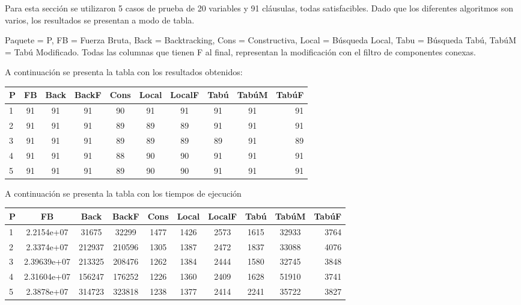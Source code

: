 \documentclass[a4paper,10pt]{article}
\begin{document}
\medskip

Para esta secci\'on se utilizaron 5 casos de prueba de 20 variables y 91 cl\'ausulas, todas satisfacibles. Dado que los diferentes algoritmos son varios, los resultados se presentan a modo de tabla.
\medskip

Paquete = P, FB = Fuerza Bruta, Back = Backtracking, Cons = Constructiva, Local = B\'usqueda Local, Tabu = B\'usqueda Tab\'u, Tab\'uM = Tab\'u Modificado. Todas las columnas que tienen F al final, representan la modificaci\'on con el filtro de componentes conexas.

A continuaci\'on se presenta la tabla con los resultados obtenidos:
\medskip

\begin{center}
\begin{tabular}{||l|c|c|c|c|c|c|c|c|r||}
\hline
\hline
P & FB & Back & BackF & Cons & Local & LocalF & Tab\'u & Tab\'uM & Tab\'uF\\
\hline
1 & 91 & 91 & 91 & 90 & 91 & 91 & 91 & 91 & 91\\
\hline
2 & 91 & 91 & 91 & 89 & 89 & 89 & 91 & 91 & 91\\
\hline
3 & 91 & 91 & 91 & 89 & 89 & 89 & 89 & 91 & 89\\
\hline
4 & 91 & 91 & 91 & 88 & 90 & 90 & 91 & 91 & 91\\
\hline
5 & 91 & 91 & 91 & 89 & 90 & 90 & 91 & 91 & 91\\
\hline
\hline
\end{tabular}
\end{center}
\medskip

A continuaci\'on se presenta la tabla con los tiempos de ejecuci\'on
\begin{center}
\begin{tabular}{||l|c|c|c|c|c|c|c|c|r||}
\hline
\hline
P & FB & Back & BackF & Cons & Local & LocalF & Tab\'u & Tab\'uM & Tab\'uF\\
\hline
1 & 2.2154e+07 & 31675 & 32299 & 1477 & 1426 & 2573 & 1615 & 32933 & 3764\\
\hline
2 & 2.3374e+07 & 212937 & 210596 & 1305 & 1387 & 2472 & 1837 & 33088 & 4076 \\
\hline
3 & 2.39639e+07 & 213325 & 208476 & 1262 & 1384 & 2444 & 1580 & 32745 & 3848\\ 
\hline
4 & 2.31604e+07 & 156247 & 176252 & 1226 & 1360 & 2409 & 1628 & 51910 & 3741\\
\hline
5 & 2.3878e+07 & 314723 & 323818 & 1238 & 1377  & 2414 & 2241 & 35722 & 3827\\
\hline
\hline
\end{tabular}
\end{center}
\medskip
\end{document}
